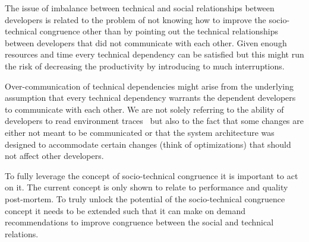 The issue of imbalance between technical and social relationships between developers is related to the problem of not knowing how to improve the socio-technical congruence other than by pointing out the technical relationships between developers that did not communicate with each other.
Given enough resources and time every technical dependency can be satisfied but this might run the risk of decreasing the productivity by introducing to much interruptions.

Over-communication of technical dependencies might arise from the underlying assumption that every technical dependency warrants the dependent developers to communicate with each other.
We are not solely referring to the ability of  developers to read environment traces~\cite{bolici:stc:2009} but also to the fact that some changes are either not meant to be communicated or that the system architecture was designed to accommodate certain changes (think of optimizations) that should not affect other developers.

To fully leverage the concept of socio-technical congruence it is important to act on it.
The current concept is only shown to relate to performance and quality post-mortem.
To truly unlock the potential of the socio-technical congruence concept it needs to be extended such that it can make on demand recommendations to improve congruence between the social and technical relations.

